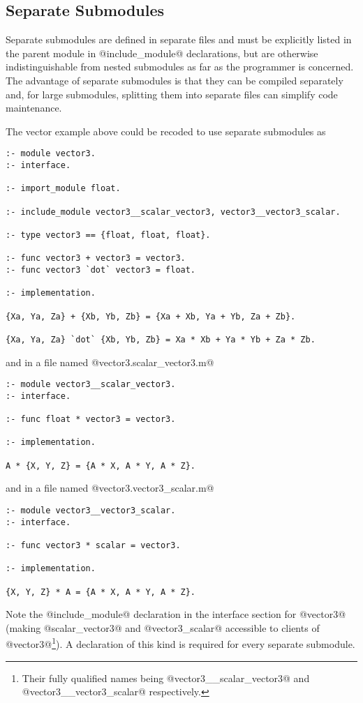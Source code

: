 \subsection{Separate Submodules}

Separate submodules are defined in separate files and must be explicitly
listed in the parent module in @include_module@ declarations, but are 
otherwise indistinguishable from nested submodules as far as the
programmer is concerned.  The advantage of separate submodules is that
they can be compiled separately  and, for
large submodules, splitting them into separate files can simplify code
maintenance.



The vector example above could be recoded to use separate submodules as
\begin{verbatim}
:- module vector3.
:- interface.

:- import_module float.

:- include_module vector3__scalar_vector3, vector3__vector3_scalar.

:- type vector3 == {float, float, float}.

:- func vector3 + vector3 = vector3.
:- func vector3 `dot` vector3 = float.
    
:- implementation.

{Xa, Ya, Za} + {Xb, Yb, Zb} = {Xa + Xb, Ya + Yb, Za + Zb}.

{Xa, Ya, Za} `dot` {Xb, Yb, Zb} = Xa * Xb + Ya * Yb + Za * Zb.
\end{verbatim}
and in a file named @vector3.scalar_vector3.m@
\begin{verbatim}
:- module vector3__scalar_vector3.
:- interface.

:- func float * vector3 = vector3.

:- implementation.

A * {X, Y, Z} = {A * X, A * Y, A * Z}.
\end{verbatim}
and in a file named @vector3.vector3_scalar.m@
\begin{verbatim}
:- module vector3__vector3_scalar.
:- interface.

:- func vector3 * scalar = vector3.

:- implementation.

{X, Y, Z} * A = {A * X, A * Y, A * Z}.
\end{verbatim}
Note the @include_module@ declaration in the interface section for
@vector3@ (making @scalar_vector3@ and @vector3_scalar@ accessible to
clients of @vector3@\footnote{Their fully qualified names being
@vector3\_\_scalar\_vector3@ and @vector3\_\_vector3\_scalar@
respectively.}).  A declaration of this kind is required for every
separate submodule.

